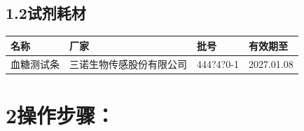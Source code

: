 \documentclass[UTF8,10pt,a4paper,fontset=fandol]{ctexart}
\newcommand{\fieldvalue}[1]{#1}
\newcommand{\handwritten}[1]{#1}
\begin{document}
\subsection*{1.2\quad 试剂耗材}

\begin{center}
\begin{tabular}{|p{3.0cm}|p{5.5cm}|p{3.0cm}|p{3.5cm}|}
\hline
名称 & 厂家 & 批号 & 有效期至 \\
\hline
血糖测试条 &
\fieldvalue{三诺生物传感股份有限公司} &
\fieldvalue{\handwritten{444?4?0-1}} &
\fieldvalue{\handwritten{2027.01.08}} \\
\hline
\end{tabular}
\end{center}

\section*{2\quad 操作步骤：}
\end{document}
